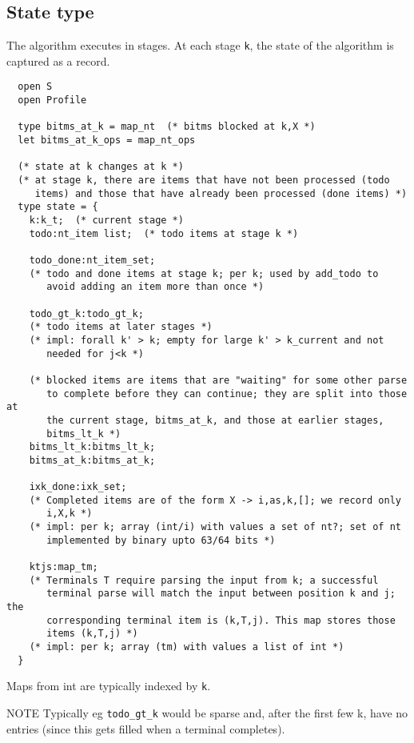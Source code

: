 \documentclass[]{article}
\begin{document}
\begin{multicols}{2}
\subsection{State type}

The algorithm executes in stages. At each stage \texttt{k}, the state of
the algorithm is captured as a record.

\begin{verbatim}
  open S
  open Profile

  type bitms_at_k = map_nt  (* bitms blocked at k,X *)
  let bitms_at_k_ops = map_nt_ops 

  (* state at k changes at k *)
  (* at stage k, there are items that have not been processed (todo
     items) and those that have already been processed (done items) *)
  type state = {
    k:k_t;  (* current stage *)
    todo:nt_item list;  (* todo items at stage k *)

    todo_done:nt_item_set;
    (* todo and done items at stage k; per k; used by add_todo to
       avoid adding an item more than once *)

    todo_gt_k:todo_gt_k;
    (* todo items at later stages *)
    (* impl: forall k' > k; empty for large k' > k_current and not
       needed for j<k *)

    (* blocked items are items that are "waiting" for some other parse
       to complete before they can continue; they are split into those at
       the current stage, bitms_at_k, and those at earlier stages,
       bitms_lt_k *)
    bitms_lt_k:bitms_lt_k;
    bitms_at_k:bitms_at_k;

    ixk_done:ixk_set;
    (* Completed items are of the form X -> i,as,k,[]; we record only
       i,X,k *)
    (* impl: per k; array (int/i) with values a set of nt?; set of nt
       implemented by binary upto 63/64 bits *)

    ktjs:map_tm;
    (* Terminals T require parsing the input from k; a successful
       terminal parse will match the input between position k and j; the
       corresponding terminal item is (k,T,j). This map stores those
       items (k,T,j) *)
    (* impl: per k; array (tm) with values a list of int *) 
  }

\end{verbatim}

Maps from int are typically indexed by \texttt{k}.

NOTE Typically eg \texttt{todo\_gt\_k} would be sparse and, after the
first few k, have no entries (since this gets filled when a terminal
completes).


\end{multicols}
\end{document}
